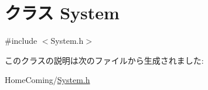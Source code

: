 \hypertarget{class_system}{\section{クラス System}
\label{class_system}
}


{\ttfamily \#include $<$System.\-h$>$}



このクラスの説明は次のファイルから生成されました\-:\begin{DoxyCompactItemize}
\item 
Home\-Coming/\hyperlink{_system_8h}{System.\-h}\end{DoxyCompactItemize}
